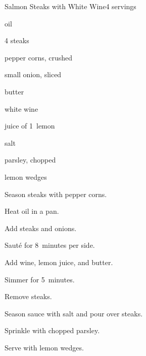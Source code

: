\begin{recipe}{Salmon Steaks with White Wine}{}{4 servings}

\begin{ingredients}
\item {} oil
\item 4   steaks
\item {} pepper corns, crushed
\item small onion, sliced
\item {} butter
\item {} white wine
\item juice of 1~lemon
\item salt
\item {} parsley, chopped
\item lemon wedges
\end{ingredients}

\begin{directions}
\item Season steaks with pepper corns.
\item Heat oil in a pan.
\item Add steaks and onions.
\item Saut\'e for 8~minutes per side.
\item Add wine, lemon juice, and butter.
\item Simmer for 5~minutes.
\item Remove steaks.
\item Season sauce with salt and pour over steaks.
\item Sprinkle with chopped parsley.
\item Serve with lemon wedges.
\end{directions}

\end{recipe}
